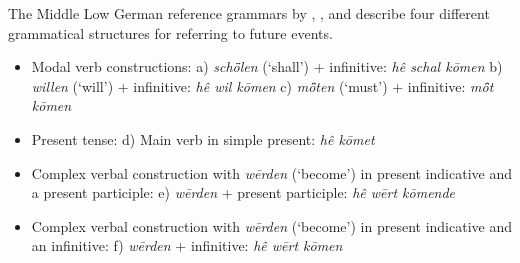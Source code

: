 \documentclass[output=paper,colorlinks,citecolor=brown]{langscibook}
\begin{document}
The Middle Low German reference grammars by \citet{Lübben1882}, \citet{Lasch1914}, and \citet{Sarauw1924} describe four different grammatical structures for referring to future events. 
\begin{itemize}
    \item Modal verb constructions:
    \subitem a) \textit{schȫlen} (‘shall’) + infinitive: \textit{hê schal kōmen}
    \subitem b) \textit{willen}  (‘will’) + infinitive: \textit{hê wil kōmen}
    \subitem c) \textit{mö̂ten}  (‘must’) + infinitive:  \textit{mö̂t kōmen} %
    \item Present tense:
    \subitem d) Main verb in simple present: \textit{hê kōmet}
    \item Complex verbal construction with \textit{wērden} (‘become’) in present indicative and a present participle:
    \subitem e) \textit{wērden} + present participle: \textit{hê wērt kōmende}
     \item Complex verbal construction with \textit{wērden} (‘become’) in present indicative and an infinitive:
    \subitem f) \textit{wērden} + infinitive: \textit{hê wērt kōmen} 
\end{itemize}
\end{document}
